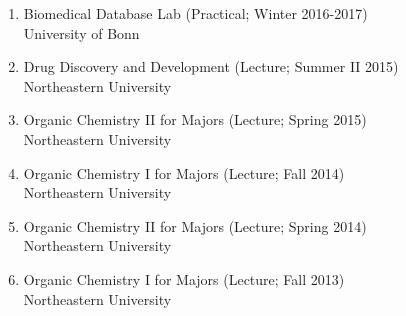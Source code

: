 \documentclass[11pt,a4paper,sans]{moderncv} %
\begin{document}
\begin{enumerate}
        \item
            Biomedical Database Lab (Practical; Winter 2016-2017)\\
    {\scriptsize University of Bonn}

        \item
            Drug Discovery and Development (Lecture; Summer II 2015)\\
    {\scriptsize Northeastern University}

        \item
            Organic Chemistry II for Majors (Lecture; Spring 2015)\\
    {\scriptsize Northeastern University}

        \item
            Organic Chemistry I for Majors (Lecture; Fall 2014)\\
    {\scriptsize Northeastern University}

        \item
            Organic Chemistry II for Majors (Lecture; Spring 2014)\\
    {\scriptsize Northeastern University}

        \item
            Organic Chemistry I for Majors (Lecture; Fall 2013)\\
    {\scriptsize Northeastern University}

    \end{enumerate}
\end{document}
